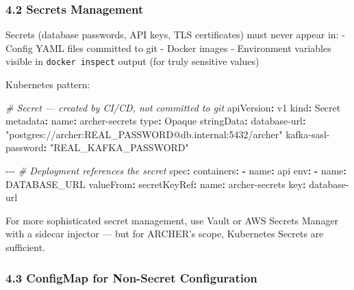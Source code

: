 \documentclass[
]{article}
\newenvironment{Shaded}{}{}
\newcommand{\AttributeTok}[1]{\textcolor[rgb]{0.49,0.56,0.16}{#1}}
\newcommand{\CommentTok}[1]{\textcolor[rgb]{0.38,0.63,0.69}{\textit{#1}}}
\newcommand{\FunctionTok}[1]{\textcolor[rgb]{0.02,0.16,0.49}{#1}}
\newcommand{\KeywordTok}[1]{\textcolor[rgb]{0.00,0.44,0.13}{\textbf{#1}}}
\newcommand{\PreprocessorTok}[1]{\textcolor[rgb]{0.74,0.48,0.00}{#1}}
\newcommand{\StringTok}[1]{\textcolor[rgb]{0.25,0.44,0.63}{#1}}
\begin{document}
\hypertarget{secrets-management}{%
\subsubsection{4.2 Secrets Management}\label{secrets-management}}

Secrets (database passwords, API keys, TLS certificates) must never
appear in: - Config YAML files committed to git - Docker images -
Environment variables visible in \texttt{docker\ inspect} output (for
truly sensitive values)

Kubernetes pattern:

\begin{Shaded}
\begin{Highlighting}[]
\CommentTok{\# Secret — created by CI/CD, not committed to git}
\FunctionTok{apiVersion}\KeywordTok{:}\AttributeTok{ v1}
\FunctionTok{kind}\KeywordTok{:}\AttributeTok{ Secret}
\FunctionTok{metadata}\KeywordTok{:}
\AttributeTok{  }\FunctionTok{name}\KeywordTok{:}\AttributeTok{ archer{-}secrets}
\FunctionTok{type}\KeywordTok{:}\AttributeTok{ Opaque}
\FunctionTok{stringData}\KeywordTok{:}
\AttributeTok{  }\FunctionTok{database{-}url}\KeywordTok{:}\AttributeTok{ }\StringTok{"postgres://archer:REAL\_PASSWORD@db.internal:5432/archer"}
\AttributeTok{  }\FunctionTok{kafka{-}sasl{-}password}\KeywordTok{:}\AttributeTok{ }\StringTok{"REAL\_KAFKA\_PASSWORD"}

\PreprocessorTok{{-}{-}{-}}
\CommentTok{\# Deployment references the secret}
\FunctionTok{spec}\KeywordTok{:}
\AttributeTok{  }\FunctionTok{containers}\KeywordTok{:}
\AttributeTok{  }\KeywordTok{{-}}\AttributeTok{ }\FunctionTok{name}\KeywordTok{:}\AttributeTok{ api}
\AttributeTok{    }\FunctionTok{env}\KeywordTok{:}
\AttributeTok{    }\KeywordTok{{-}}\AttributeTok{ }\FunctionTok{name}\KeywordTok{:}\AttributeTok{ DATABASE\_URL}
\AttributeTok{      }\FunctionTok{valueFrom}\KeywordTok{:}
\AttributeTok{        }\FunctionTok{secretKeyRef}\KeywordTok{:}
\AttributeTok{          }\FunctionTok{name}\KeywordTok{:}\AttributeTok{ archer{-}secrets}
\AttributeTok{          }\FunctionTok{key}\KeywordTok{:}\AttributeTok{ database{-}url}
\end{Highlighting}
\end{Shaded}

For more sophisticated secret management, use Vault or AWS Secrets
Manager with a sidecar injector --- but for ARCHER's scope, Kubernetes
Secrets are sufficient.

\hypertarget{configmap-for-non-secret-configuration}{%
\subsubsection{4.3 ConfigMap for Non-Secret
Configuration}\label{configmap-for-non-secret-configuration}}
\end{document}
